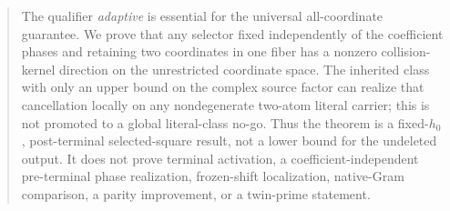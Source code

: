\begin{abstract}
The qualifier \emph{adaptive} is essential for the universal
all-coordinate guarantee.  We prove that any selector fixed independently
of the coefficient phases and retaining two coordinates in one fiber has a
nonzero collision-kernel direction on the unrestricted coordinate space.
The inherited class with only an upper bound on the complex source factor
can realize that cancellation locally on any nondegenerate two-atom literal
carrier; this is not promoted to a global literal-class no-go.
Thus the theorem is a fixed-\(h_0\), post-terminal selected-square result,
not a lower bound for the undeleted output.  It does not prove terminal
activation, a coefficient-independent pre-terminal phase realization,
frozen-shift localization, native-Gram comparison, a parity improvement,
or a twin-prime statement.
\end{abstract}
